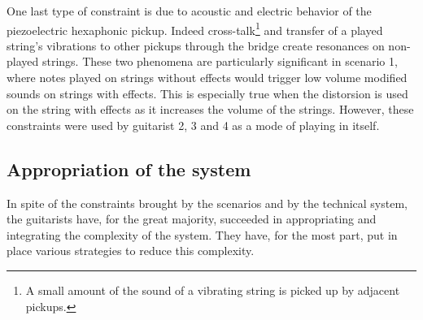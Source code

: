 \documentclass{article}
\begin{document}
One last type of constraint is due to acoustic and electric behavior of the piezoelectric hexaphonic pickup. Indeed cross-talk\footnote{A small amount of the sound of a vibrating string is picked up by adjacent pickups.} and transfer of a played string's vibrations to other pickups through the bridge create resonances on non-played strings. These two phenomena are particularly significant in scenario 1, where notes played on strings without effects would trigger low volume modified sounds on strings with effects. This is especially true when the distorsion is used on the string with effects as it increases the volume of the strings.
However, these constraints were used by guitarist 2, 3 and 4 as a mode of playing in itself. 




\subsection{Appropriation of the system}

In spite of the constraints brought by the scenarios and by the technical system, the guitarists have, for the great majority, succeeded in appropriating and integrating the complexity of the system. They have, for the most part, put in place various strategies to reduce this complexity.
\end{document}
